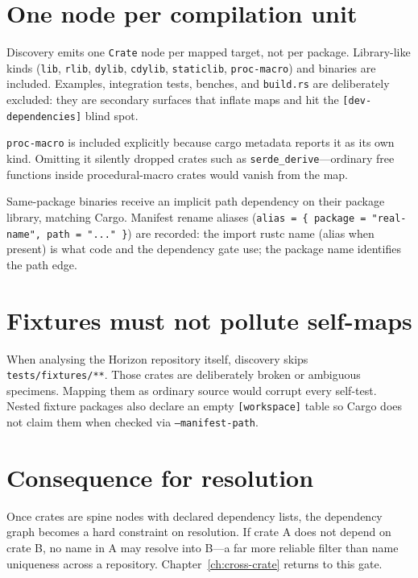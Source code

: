 \documentclass[11pt,a4paper,oneside]{report}
\newcommand{\horizon}{Horizon}
\begin{document}
\section{One node per compilation unit}

Discovery emits one \texttt{Crate} node per mapped target, not per package.
Library-like kinds (\texttt{lib}, \texttt{rlib}, \texttt{dylib},
\texttt{cdylib}, \texttt{staticlib}, \texttt{proc-macro}) and binaries are
included. Examples, integration tests, benches, and \texttt{build.rs} are
deliberately excluded: they are secondary surfaces that inflate maps and hit
the \texttt{[dev-dependencies]} blind spot.

\texttt{proc-macro} is included explicitly because cargo metadata reports it
as its own kind. Omitting it silently dropped crates such as
\texttt{serde\_derive}---ordinary free functions inside procedural-macro
crates would vanish from the map.

Same-package binaries receive an implicit path dependency on their package
library, matching Cargo. Manifest rename aliases
(\texttt{alias = \{ package = "real-name", path = "..." \}}) are recorded:
the import rustc name (alias when present) is what code and the dependency
gate use; the package name identifies the path edge.

\section{Fixtures must not pollute self-maps}

When analysing the \horizon{} repository itself, discovery skips
\texttt{tests/fixtures/**}. Those crates are deliberately broken or ambiguous
specimens. Mapping them as ordinary source would corrupt every self-test.
Nested fixture packages also declare an empty \texttt{[workspace]} table so
Cargo does not claim them when checked via \texttt{--manifest-path}.

\section{Consequence for resolution}

Once crates are spine nodes with declared dependency lists, the dependency
graph becomes a hard constraint on resolution. If crate A does not depend on
crate B, no name in A may resolve into B---a far more reliable filter than
name uniqueness across a repository. Chapter~\ref{ch:cross-crate} returns to
this gate.

\end{document}

